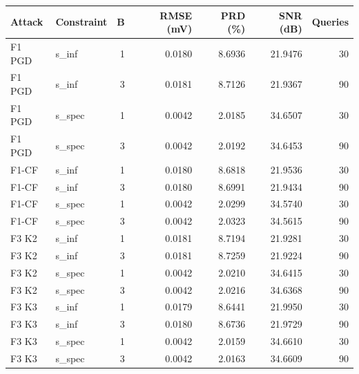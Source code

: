 \begin{tabular}{llrrrrr}
\toprule
Attack & Constraint & B & RMSE (mV) & PRD (\%) & SNR (dB) & Queries \\
\midrule
F1 PGD & s\_inf & 1 & 0.0180 & 8.6936 & 21.9476 & 30 \\
F1 PGD & s\_inf & 3 & 0.0181 & 8.7126 & 21.9367 & 90 \\
F1 PGD & s\_spec & 1 & 0.0042 & 2.0185 & 34.6507 & 30 \\
F1 PGD & s\_spec & 3 & 0.0042 & 2.0192 & 34.6453 & 90 \\
F1-CF & s\_inf & 1 & 0.0180 & 8.6818 & 21.9536 & 30 \\
F1-CF & s\_inf & 3 & 0.0180 & 8.6991 & 21.9434 & 90 \\
F1-CF & s\_spec & 1 & 0.0042 & 2.0299 & 34.5740 & 30 \\
F1-CF & s\_spec & 3 & 0.0042 & 2.0323 & 34.5615 & 90 \\
F3 K2 & s\_inf & 1 & 0.0181 & 8.7194 & 21.9281 & 30 \\
F3 K2 & s\_inf & 3 & 0.0181 & 8.7259 & 21.9224 & 90 \\
F3 K2 & s\_spec & 1 & 0.0042 & 2.0210 & 34.6415 & 30 \\
F3 K2 & s\_spec & 3 & 0.0042 & 2.0216 & 34.6368 & 90 \\
F3 K3 & s\_inf & 1 & 0.0179 & 8.6441 & 21.9950 & 30 \\
F3 K3 & s\_inf & 3 & 0.0180 & 8.6736 & 21.9729 & 90 \\
F3 K3 & s\_spec & 1 & 0.0042 & 2.0159 & 34.6610 & 30 \\
F3 K3 & s\_spec & 3 & 0.0042 & 2.0163 & 34.6609 & 90 \\
\bottomrule
\end{tabular}
